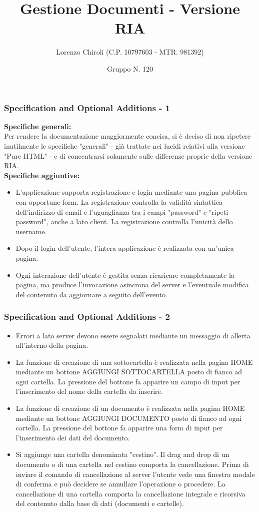 \documentclass[aspectratio=169, dvipsnames]{beamer}
\title{Gestione Documenti - Versione RIA}
\author{Lorenzo Chiroli (C.P. 10797603 - MTR. 981392)}
\date{Gruppo N. 120}
\begin{document}
\frame{\titlepage}

\begin{frame}
    \frametitle{Specification and Optional Additions - 1}
    \textbf{Specifiche generali:}\\
    Per rendere la documentazione maggiormente concisa, si è deciso di non ripetere inutilmente le specifiche
    "generali" - già trattate nei lucidi relativi alla versione "Pure HTML" - e di concentrarsi solamente sulle
    differenze proprie della versione RIA.\\

    \textbf{Specifiche aggiuntive:}
    \begin{itemize}
        \item L'applicazione supporta registrazione e login mediante una pagina pubblica con opportune
              form. La registrazione controlla la validità sintattica dell'indirizzo di email e l'uguaglianza
              tra i campi "password" e "ripeti password", anche a lato client. La registrazione controlla
              l'unicità dello username.
        \item Dopo il login dell'utente, l'intera applicazione è realizzata con un'unica pagina.
        \item Ogni interazione dell'utente è gestita senza ricaricare completamente la pagina, ma produce
              l'invocazione asincrona del server e l'eventuale modifica del contenuto da aggiornare a
              seguito dell'evento.
    \end{itemize}
\end{frame}

\begin{frame}
    \frametitle{Specification and Optional Additions - 2}
    \begin{itemize}
        \item Errori a lato server devono essere segnalati mediante un messaggio di allerta all'interno
              della pagina.
        \item La funzione di creazione di una sottocartella è realizzata nella pagina HOME mediante un
              bottone AGGIUNGI SOTTOCARTELLA posto di fianco ad ogni cartella. La pressione del
              bottone fa apparire un campo di input per l'inserimento del nome della cartella da inserire.
        \item La funzione di creazione di un documento è realizzata nella pagina HOME mediante un
              bottone AGGIUNGI DOCUMENTO posto di fianco ad ogni cartella. La pressione del
              bottone fa apparire una form di input per l'inserimento dei dati del documento.
        \item Si aggiunge una cartella denominata "cestino". Il drag and drop di un documento o di una
              cartella nel cestino comporta la cancellazione. Prima di inviare il comando di cancellazione
              al server l'utente vede una finestra modale di conferma e può decidere se annullare
              l'operazione o procedere. La cancellazione di una cartella comporta la cancellazione
              integrale e ricorsiva del contenuto dalla base di dati (documenti e cartelle).
    \end{itemize}
\end{frame}
\end{document}
